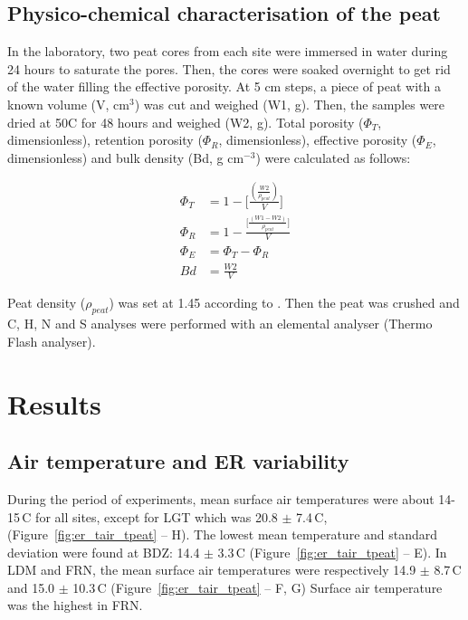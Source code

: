 \subsection{Physico-chemical characterisation of the peat}

In the laboratory, two peat cores from each site were immersed in water during 24 hours to saturate the pores. 
Then, the cores were soaked overnight to get rid of the water filling the effective porosity. 
At 5 cm steps, a piece of peat with a known volume (V, cm$^{3}$) was cut and weighed (W1, g). 
Then, the samples were dried at 50\textdegree C for 48 hours and weighed (W2, g). 
Total porosity ($\Phi_{T}$, dimensionless), retention porosity ($\Phi_{R}$, dimensionless), effective porosity ($\Phi_{E}$, dimensionless) and bulk density (Bd, g cm$^{-3}$) were calculated as follows:

\begin{align}
\Phi_{T} & = 1 - \bigg[\frac{(\frac{W2}{\rho_{peat}})}{V}\bigg] \label{eq_por_tot}\\
\Phi_{R} & = 1 - \frac{\Big[\frac{(W1-W2)}{\rho_{peat}}\Big]}{V} \label{eq_por_ret}\\
\Phi_{E} & = \Phi_{T} - \Phi_{R} \label{eq_pro_eff}\\
Bd & = \frac{W2}{V} \label{eq_bd}
\end{align}

Peat density ($\rho_{peat}$) was set at 1.45 according to \citet{Kennedy2005}.
Then the peat was crushed and C, H, N and S analyses were performed with an elemental analyser (Thermo Flash analyser). 

\section{Results}

\subsection{Air temperature and ER variability}

During the period of experiments, mean surface air temperatures were about 14-15\,\textdegree C for all sites, except for LGT which was 20.8 $\pm$ 7.4\,\textdegree C, (Figure~\ref{fig:er_tair_tpeat} -- H).
The lowest mean temperature and standard deviation were found at BDZ: 14.4 $\pm$ 3.3\,\textdegree C (Figure~\ref{fig:er_tair_tpeat} -- E).
In LDM and FRN, the mean surface air temperatures were respectively 14.9 $\pm$ 8.7\,\textdegree C and 15.0 $\pm$ 10.3\,\textdegree C (Figure~\ref{fig:er_tair_tpeat} -- F, G)
Surface air temperature was the highest in FRN.

